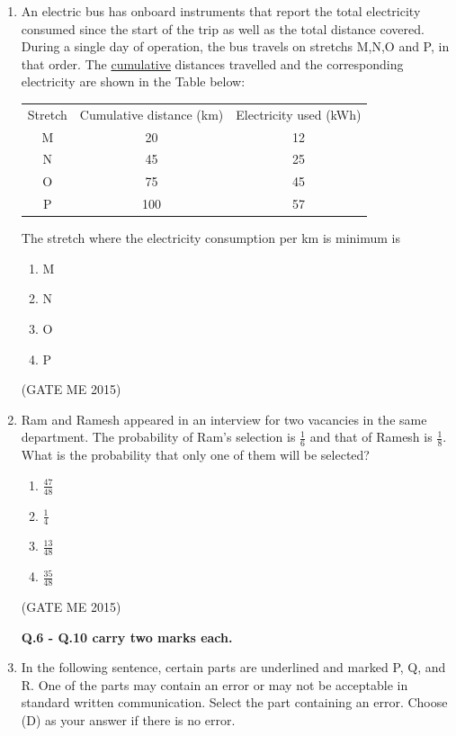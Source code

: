 \documentclass[journal]{IEEEtran}
\begin{document}
\begin{enumerate}
\item An electric bus has onboard instruments that report the total electricity consumed since the start of the trip as well as the total distance covered. During a single day of operation, the bus travels on stretchs M,N,O and P, in that order. The \underline{cumulative} distances travelled and the corresponding electricity are shown in the Table below:

\begin{tabular}{|c|c|c|}
\hline
 Stretch & Cumulative distance (km) & Electricity used (kWh) \\
 M & 20 & 12 \\
 \hline
 N & 45 & 25 \\
 \hline
 O & 75 & 45 \\
 \hline
 P & 100 & 57 \\
\hline
\end{tabular}


The stretch where the electricity consumption per km is minimum is
\begin{multicols}{4}
\begin{enumerate}
\item M  
\item N  
\item O  
\item P  
\end{enumerate}
\end{multicols}
\hfill  (GATE ME 2015)

\item Ram and Ramesh appeared in an interview for two vacancies in the same department. The probability of Ram's selection is $ \frac{1}{6} $ and that of Ramesh is $ \frac{1}{8} $. What is the probability that only one of them will be selected?
\begin{enumerate}
\item $ \frac{47}{48} $  
\item $ \frac{1}{4} $  
\item $ \frac{13}{48} $  
\item $ \frac{35}{48} $  
\end{enumerate}
\hfill  (GATE ME 2015)

\textbf{Q.6 - Q.10 carry two marks each.}

\item In the following sentence, certain parts are underlined and marked P, Q, and R. One of the parts may contain an error or may not be acceptable in standard written communication. Select the part containing an error. Choose (D) as your answer if there is no error.


\end{enumerate}
\end{document}
